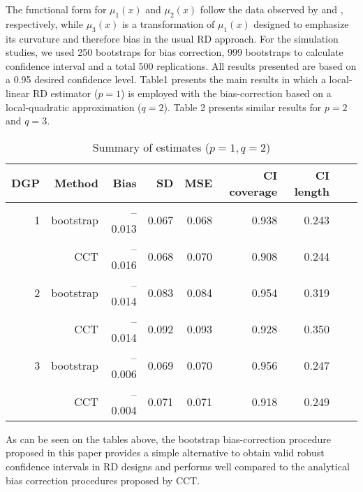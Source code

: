 \documentclass[12pt,fleqn]{article}
\begin{document}
The functional form for $\mu_{1}(x)$ and $\mu_{2}(x)$ follow the data observed by \cite{lee2008} and \cite{ludwig2007}, respectively, while $\mu_{3}(x)$ is a transformation of $\mu_{1}(x)$ designed to emphasize its curvature and therefore bias in the usual RD approach. For the simulation studies, we used 250 bootstraps for bias correction, 999 bootstraps to calculate confidence interval and a total 500 replications. All results presented are based on a 0.95 desired confidence level. Table1 presents the main results in which a local-linear RD estimator ($p=1$) is employed with the bias-correction based on a local-quadratic approximation ($q=2$). Table 2 presents similar results for $p=2$ and $q=3$.

\begin{table}[t] \label{Tb1}
\centering
\begin{tabular}{rrrrrrrrr}
  \toprule
  DGP & Method    & Bias    & SD    & MSE   & CI coverage & CI length \\
  \midrule
  1   & bootstrap & --0.013 & 0.067 & 0.068 & 0.938       & 0.243     \\
      & CCT       & --0.016 & 0.068 & 0.070 & 0.908       & 0.244     \\
  2   & bootstrap & --0.014 & 0.083 & 0.084 & 0.954       & 0.319     \\
      & CCT       & --0.014 & 0.092 & 0.093 & 0.928       & 0.350     \\
  3   & bootstrap & --0.006 & 0.069 & 0.070 & 0.956       & 0.247     \\
      & CCT       & --0.004 & 0.071 & 0.071 & 0.918       & 0.249     \\
  \bottomrule
\end{tabular}
\caption{Summary of estimates ($p = 1, q = 2$)}
\end{table}

As can be seen on the tables above, the bootstrap bias-correction procedure
proposed in this paper provides a simple alternative to obtain valid robust
confidence intervals in RD designs and performs well compared to the analytical 
bias correction procedures proposed by CCT.
\end{document}

